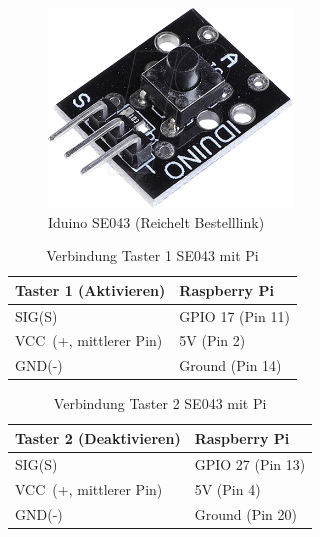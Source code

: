 \documentclass[12pt,a4paper,openany]{scrbook}
\begin{document}
	\begin{figure}[H]
	\centering
	\includegraphics[height=150pt]{img/SE043}
	\caption{Iduino SE043 (Reichelt Bestelllink)}
	\label{Bildlabel}
\end{figure}

\begin{table}[H]
	\centering
	\begin{tabular}{|p{5cm}|p{5cm}|} 
		\hline
		Taster 1 (Aktivieren) & Raspberry Pi  \\ 
		\hline
		SIG(S)                   & GPIO 17 (Pin 11)               \\ 
		\hline
		VCC~(+, mittlerer Pin)                  & 5V (Pin 2)            \\ 
		\hline
		GND(-)                   & Ground (Pin 14)           \\
		\hline
	\end{tabular}
	\caption{Verbindung Taster 1 SE043 mit Pi} 
\end{table}


\begin{table}[H]
	\centering
	\begin{tabular}{|p{5cm}|p{5cm}|} 
		\hline
		Taster 2 (Deaktivieren) & Raspberry Pi  \\ 
		\hline
		SIG(S)                   & GPIO 27 (Pin 13)                \\ 
		\hline
		VCC~(+, mittlerer Pin)                  & 5V  (Pin 4)          \\ 
		\hline
		GND(-)                   & Ground (Pin 20)           \\
		\hline
	\end{tabular}
	\caption{Verbindung Taster 2 SE043 mit Pi} 
\end{table}
\end{document}
